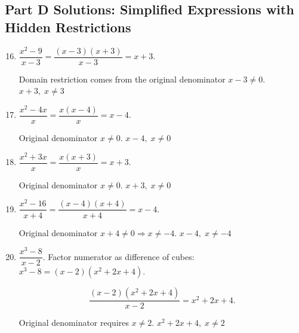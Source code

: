 \documentclass[14pt]{extarticle}
\begin{document}
\subsection*{Part D Solutions: Simplified Expressions with Hidden Restrictions}
\begin{enumerate}
  \setcounter{enumi}{15}
  \item \(\dfrac{x^2 - 9}{x - 3}
  = \dfrac{(x-3)(x+3)}{x-3}
  = x + 3.\)
  
  Domain restriction comes from the original denominator \(x - 3 \ne 0\).  
  \(\boxed{x + 3,\; x \ne 3}\)

  \item \(\dfrac{x^2 - 4x}{x}
  = \dfrac{x(x - 4)}{x}
  = x - 4.\)
  
  Original denominator \(x \ne 0.\)  
  \(\boxed{x - 4,\; x \ne 0}\)

  \item \(\dfrac{x^2 + 3x}{x}
  = \dfrac{x(x + 3)}{x}
  = x + 3.\)
  
  Original denominator \(x \ne 0.\)  
  \(\boxed{x + 3,\; x \ne 0}\)

  \item \(\dfrac{x^2 - 16}{x + 4}
  = \dfrac{(x - 4)(x + 4)}{x + 4}
  = x - 4.\)
  
  Original denominator \(x + 4 \ne 0 \Rightarrow x \ne -4.\)  
  \(\boxed{x - 4,\; x \ne -4}\)

  \item \(\dfrac{x^3 - 8}{x - 2}\).  
  Factor numerator as difference of cubes:  
  \(x^3 - 8 = (x - 2)(x^2 + 2x + 4).\)

  \[
  \dfrac{(x - 2)(x^2 + 2x + 4)}{x - 2} = x^2 + 2x + 4.
  \]

  Original denominator requires \(x \ne 2.\)  
  \(\boxed{x^2 + 2x + 4,\; x \ne 2}\)
\end{enumerate}
\end{document}
